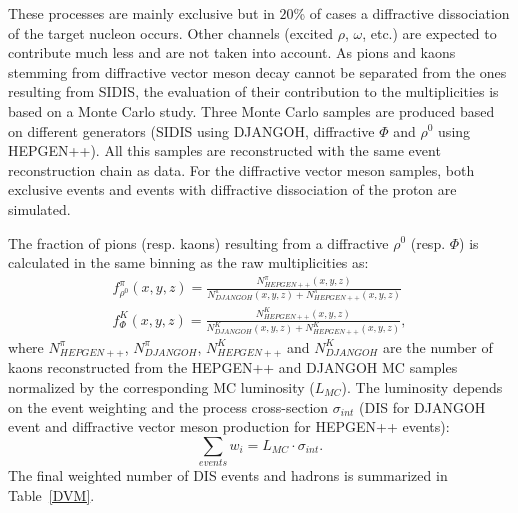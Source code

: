 These processes are mainly exclusive but in $20$\% of cases a diffractive dissociation of the target nucleon occurs. Other channels (excited $\rho$, $\omega$, etc.) are expected to contribute much less and are not taken into account. As pions and kaons stemming from diffractive vector meson decay cannot be separated from the ones resulting from SIDIS, the evaluation of their contribution to the multiplicities is based on a Monte Carlo study. Three Monte Carlo samples are produced based on different generators (SIDIS using DJANGOH, diffractive $\Phi$ and $\rho^0$ using HEPGEN++). All this samples are reconstructed with the same event reconstruction chain as data. For the diffractive vector meson samples, both exclusive events and events with diffractive dissociation of the proton are simulated.

The fraction of pions (resp. kaons) resulting from a diffractive $\rho^0$ (resp. $\Phi$) is calculated in the same binning as the raw multiplicities as:
%
\begin{equation}\label{eq:DVMhad}
  \begin{split}
    f^{\pi}_{\rho^0}(x,y,z) = \frac{N^{\pi}_{HEPGEN++}(x,y,z)}{N^{\pi}_{DJANGOH}(x,y,z)+N^{\pi}_{HEPGEN++}(x,y,z)} \\
    f^K_{\Phi}(x,y,z) = \frac{N^K_{HEPGEN++}(x,y,z)}{N^K_{DJANGOH}(x,y,z)+N^K_{HEPGEN++}(x,y,z)},
  \end{split}
\end{equation}
%
where $N^{\pi}_{HEPGEN++}$, $N^{\pi}_{DJANGOH}$, $N^K_{HEPGEN++}$ and $N^K_{DJANGOH}$ are the number of kaons reconstructed from the HEPGEN++ and DJANGOH MC samples normalized by the corresponding MC luminosity ($L_{MC}$). The luminosity depends on the event weighting and the process cross-section $\sigma_{int}$ (DIS for DJANGOH event and diffractive vector meson production for HEPGEN++ events):
%
\begin{equation} \label{eq:reweight}
  \sum_{events} w_i = L_{MC} \cdot \sigma_{int}.
\end{equation}
%
The final weighted number of DIS events and hadrons is summarized in Table~\ref{DVM}.


